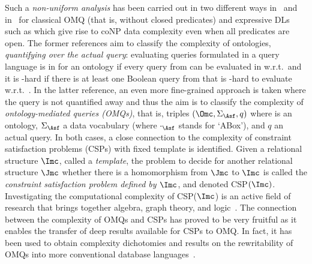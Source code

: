 \documentclass{lmcs}
\theoremstyle{definition}
\begin{document}
Such a \emph{non-uniform analysis} has been carried out in two different ways in~\cite{DBLP:journals/lmcs/LutzW17,DBLP:conf/pods/HernichLPW17} 
and in~\cite{DBLP:journals/tods/BienvenuCLW14} for classical OMQ (that is,
without closed predicates) and expressive DLs such as \ALC which give
rise to {\sc coNP} data complexity even when all predicates are
open. The former references aim to classify the complexity of
ontologies, \emph{quantifying over the actual query}: evaluating
queries formulated in a query language \Qmc is in \PTime for an
ontology \Omc if every query from \Qmc can be evaluated in \PTime
w.r.t.\ \Omc and it is \conp-hard if there is at least one Boolean
query from \Qmc that is \conp-hard to evaluate w.r.t.~\Omc. In the
latter reference, an even more fine-grained approach is taken where
the query is not quantified away and thus the aim is to classify the
complexity of \emph{ontology-mediated queries (OMQs)}, that is,
triples $(\Omc,\Sigma_\Asf,q)$ where \Omc is an ontology,
$\Sigma_\Asf$ a data vocabulary (where $\cdot_\Asf$ stands for
`ABox'), and $q$ an actual query. In both cases, a close connection to
the complexity of constraint satisfaction problems (CSPs) with fixed
template is identified. Given a relational structure $\Imc$, called a \emph{template},
the problem to decide for another relational structure $\Jmc$ whether there is a 
homomorphism from $\Jmc$ to $\Imc$ is called the \emph{constraint satisfaction problem
defined by $\Imc$}, and denoted CSP$(\Imc)$. Investigating the computational
complexity of CSP($\Imc$) is an active field of research that brings together algebra, 
graph theory, and logic~\cite{DBLP:conf/stoc/FederV93,DBLP:journals/siamcomp/BulatovJK05,DBLP:conf/csl/Krokhin10,DBLP:journals/corr/Bulatov17a,DBLP:journals/corr/Zhuk17}.
The connection between the complexity of OMQs and CSPs has proved to be very fruitful as it enables the
transfer of deep results available for CSPs to OMQ. In fact, it has
been used to obtain complexity dichotomies and results on the rewritability of OMQs into more conventional
database languages~\cite{DBLP:journals/tods/BienvenuCLW14,DBLP:journals/lmcs/LutzW17,DBLP:conf/pods/HernichLPW17,DBLP:conf/icdt/FeierKL17}.
\end{document}
